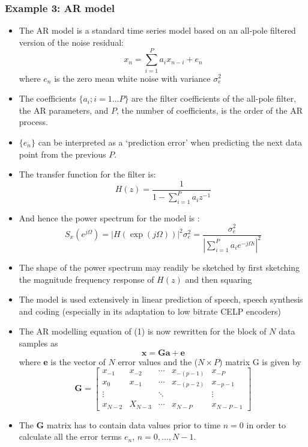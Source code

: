 \documentclass[12pt]{article}
\newcommand{\sigd}{\sigma^2}
\begin{document}
\subsubsection{Example 3: AR model}
    \begin{itemize}
        \item The AR model is a standard time series model based on an all-pole filtered version of the noise residual:
        \[
        x_n = \sum_{i=1}^P a_i x_{n-i} + e_n
        \]
        where $e_n$ is the zero mean white noise with variance $\sigd_e$
        \item The coefficients $\{ a_i; i=1...P \}$ are the filter coefficients of the all-pole filter, the AR parameters, and $P$, the number of coefficients, is the order of the AR process.
        \item $\{ e_n\}$ can be interpreted as a `prediction error' when predicting the next data point from the previous $P$.
        \item The transfer function for the filter is:
        \[
        H(z) = \frac{1}{1 - \sum_{i=1}^P  a_i z^{-1} }        
        \]
        \item And hence the power spectrum for the model is :
        \[
        S_x(e^{j\Omega}) = |H(\exp(j\Omega))|^2 \sigd_e = \frac{\sigd_e}{|\sum_{i=1}^P  a_i e^{-j\Omega i}|^2 }
        \]
        \item The shape of the power spectrum may readily be sketched by first sketching the magnitude frequency response of $H(z)$ and then squaring
        \item The model is used extensively in linear prediction of speech, speech synthesis and coding (especially in its adaptation to low bitrate CELP encoders)
        \item The AR modelling equation of (1) is now rewritten for the block of $N$ data samples as 
        \[
        \mathbf{x = G a + e}
        \]
        where \textbf{e} is the vector of $N$ error values and the ($N\times P$) matrix G is given by 
        \[
        \mathbf{G} = \begin{bmatrix}
        x_{-1} & x_{-2} & \cdots & x_{-(p-1)} & x_{-P}\\
        x_0 & x_{-1} & \cdots & x_{-(p-2)} & x_{-{p-1}} \\
        \vdots & & \ddots & & \vdots \\
        x_{N-2} & X_{N-3} & \cdots & x_{N-P} & x_{N-P-1} 
        \end{bmatrix}
        \]
        \item The \textbf{G} matrix has to contain data values prior to time $n=0$ in order to calculate all the error terms $e_n$, $n = 0,...,N-1$.

\end{itemize}
\end{document}
